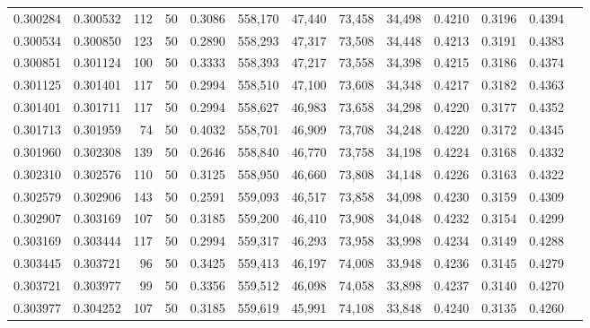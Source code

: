\begin{tabular}{rrrrrrrrrrrrr}
0.300284 & 0.300532 &   112 &  50 &                                     0.3086 & 558,170 &  47,440 &  73,458 &  34,498 & 0.4210 & 0.3196 & 0.4394 \\
0.300534 & 0.300850 &   123 &  50 &                                     0.2890 & 558,293 &  47,317 &  73,508 &  34,448 & 0.4213 & 0.3191 & 0.4383 \\
0.300851 & 0.301124 &   100 &  50 &                                     0.3333 & 558,393 &  47,217 &  73,558 &  34,398 & 0.4215 & 0.3186 & 0.4374 \\
0.301125 & 0.301401 &   117 &  50 &                                     0.2994 & 558,510 &  47,100 &  73,608 &  34,348 & 0.4217 & 0.3182 & 0.4363 \\
0.301401 & 0.301711 &   117 &  50 &                                     0.2994 & 558,627 &  46,983 &  73,658 &  34,298 & 0.4220 & 0.3177 & 0.4352 \\
0.301713 & 0.301959 &    74 &  50 &                                     0.4032 & 558,701 &  46,909 &  73,708 &  34,248 & 0.4220 & 0.3172 & 0.4345 \\
0.301960 & 0.302308 &   139 &  50 &                                     0.2646 & 558,840 &  46,770 &  73,758 &  34,198 & 0.4224 & 0.3168 & 0.4332 \\
0.302310 & 0.302576 &   110 &  50 &                                     0.3125 & 558,950 &  46,660 &  73,808 &  34,148 & 0.4226 & 0.3163 & 0.4322 \\
0.302579 & 0.302906 &   143 &  50 &                                     0.2591 & 559,093 &  46,517 &  73,858 &  34,098 & 0.4230 & 0.3159 & 0.4309 \\
0.302907 & 0.303169 &   107 &  50 &                                     0.3185 & 559,200 &  46,410 &  73,908 &  34,048 & 0.4232 & 0.3154 & 0.4299 \\
0.303169 & 0.303444 &   117 &  50 &                                     0.2994 & 559,317 &  46,293 &  73,958 &  33,998 & 0.4234 & 0.3149 & 0.4288 \\
0.303445 & 0.303721 &    96 &  50 &                                     0.3425 & 559,413 &  46,197 &  74,008 &  33,948 & 0.4236 & 0.3145 & 0.4279 \\
0.303721 & 0.303977 &    99 &  50 &                                     0.3356 & 559,512 &  46,098 &  74,058 &  33,898 & 0.4237 & 0.3140 & 0.4270 \\
0.303977 & 0.304252 &   107 &  50 &                                     0.3185 & 559,619 &  45,991 &  74,108 &  33,848 & 0.4240 & 0.3135 & 0.4260 \\

\end{tabular}
